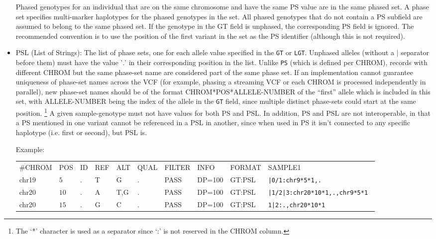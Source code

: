\documentclass[8pt]{article}
\begin{document}
\begin{itemize}
  Phased genotypes for an individual that are on the same chromosome and have the same PS value are in the same phased set.
  A phase set specifies multi-marker haplotypes for the phased genotypes in the set.
  All phased genotypes that do not contain a PS subfield are assumed to belong to the same phased set.
  If the genotype in the GT field is unphased, the corresponding PS field is ignored.
  The recommended convention is to use the position of the first variant in the set as the PS identifier (although this is not required).
  \item PSL (List of Strings): The list of phase sets, one for each allele value specified in the {\tt GT} or {\tt LGT}. 
  Unphased alleles (without a $\mid$ separator before them) must have the value '$.$' in their corresponding position in the list.
  Unlike {\tt PS} (which is defined per CHROM), records with different CHROM but the same phase-set name are considered part of the same phase set.
  If an implementation cannot guarantee uniqueness of phase-set names across the VCF (for example, phasing a streaming VCF or each CHROM is processed independently in parallel), new phase-set names should be of the format CHROM*POS*ALLELE-NUMBER of the ``first'' allele which is included in this set, with ALLELE-NUMBER being the index of the allele in the {\tt GT} field, since multiple distinct phase-sets could start at the same position. \footnote{The `*' character is used as a separator since `:' is not reserved in the CHROM column.}
  A given sample-genotype must not have values for both PS and PSL.
  In addition, PS and PSL are not interoperable, in that a PS mentioned in one variant cannot be referenced in a PSL in another,  since when used in PS it isn't connected to any specific haplotype (i.e. first or second), but PSL is. 
 
  Example:
  
  \vspace{0.5em}
  \begin{tabular}{ l l l l l l l l l l}
    \#CHROM & POS & ID & REF & ALT & QUAL & FILTER & INFO & FORMAT & SAMPLE1\\
     chr19 & $5$ & . & T & G & . & PASS & DP=100 &GT:PSL & \tt{|0/1:chr9*5*1,.}\\
    chr20 & $10$ & . & A & T,G & . & PASS & DP=100 &GT:PSL & \tt{|1/2|3:chr20*10*1,.,chr9*5*1} \\
    chr20 & $15$ & . & G & C & . & PASS & DP=100 &GT:PSL & \tt{1|2:.,chr20*10*1}\\
  \end{tabular}
  

\end{itemize}
\end{document}
